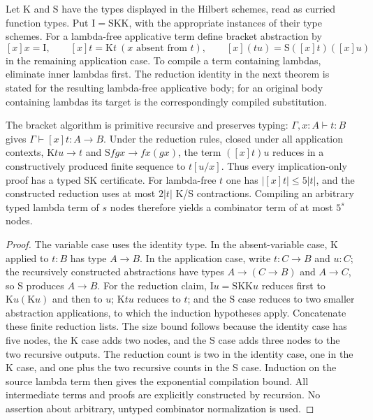 Let K and S have the types displayed in the Hilbert schemes, read as
curried function types. Put $\mathrm I=\mathrm{SKK}$, with the appropriate
instances of their type schemes. For a lambda-free applicative term define bracket
abstraction by
\[
 [x]x=\mathrm I,\qquad [x]t=\mathrm Kt\ (x\text{ absent from }t),\qquad
 [x](tu)=\mathrm S([x]t)([x]u)
\]
in the remaining application case. To compile a term containing lambdas,
eliminate inner lambdas first. The reduction identity in the next theorem
is stated for the resulting lambda-free applicative body; for an original
body containing lambdas its target is the correspondingly compiled substitution.

\begin{theorem}\label{thm:sk}
The bracket algorithm is primitive recursive and preserves typing:
$\Gamma,x:A\vdash t:B$ gives $\Gamma\vdash[x]t:A\to B$.
Under the reduction rules, closed under all application contexts,
$\mathrm Ktu\to t$ and $\mathrm Sfgx\to fx(gx)$,
the term $([x]t)u$ reduces in a constructively produced finite sequence
to $t[u/x]$. Thus every implication-only proof has a typed SK certificate.
For lambda-free $t$ one has $|[x]t|\le5|t|$, and the constructed reduction
uses at most $2|t|$ K/S contractions. Compiling an arbitrary typed lambda
term of $s$ nodes therefore yields a combinator term of at most $5^s$ nodes.
\end{theorem}
\begin{proof}
The variable case uses the identity type. In the absent-variable case,
K applied to $t:B$ has type $A\to B$. In the application case, write
$t:C\to B$ and $u:C$; the recursively constructed abstractions have
types $A\to(C\to B)$ and $A\to C$, so S produces $A\to B$.
For the reduction claim, $\mathrm Iu=\mathrm{SKK}u$ reduces first to
$\mathrm Ku(\mathrm Ku)$ and then to $u$; $\mathrm Ktu$ reduces to $t$;
and the S case reduces to two smaller abstraction applications, to which
the induction hypotheses apply. Concatenate these finite reduction lists.
The size bound follows because the identity case has five nodes, the K
case adds two nodes, and the S case adds three nodes to the two recursive
outputs. The reduction count is two in the identity case, one in the K
case, and one plus the two recursive counts in the S case. Induction on
the source lambda term then gives the exponential compilation bound.
All intermediate terms and proofs are explicitly constructed by recursion.
No assertion about arbitrary, untyped combinator normalization is used.
\end{proof}
